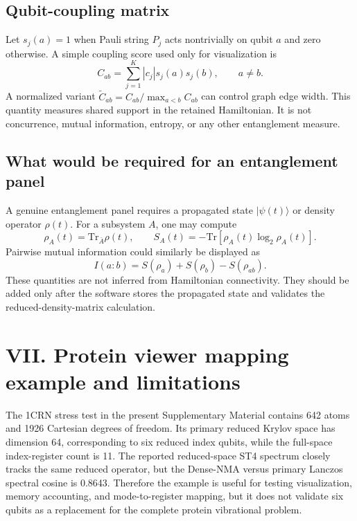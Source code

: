 \documentclass[10pt]{article}
\begin{document}
\subsection*{Qubit-coupling matrix}
Let $s_j(a)=1$ when Pauli string $P_j$ acts nontrivially on qubit $a$ and zero otherwise. A simple coupling score used only for visualization is
\begin{equation}
 C_{ab}=\sum_{j=1}^{K}|c_j|s_j(a)s_j(b),\qquad a\neq b.
\end{equation}
A normalized variant $\widetilde C_{ab}=C_{ab}/\max_{a<b}C_{ab}$ can control graph edge width. This quantity measures shared support in the retained Hamiltonian. It is not concurrence, mutual information, entropy, or any other entanglement measure.

\subsection*{What would be required for an entanglement panel}
A genuine entanglement panel requires a propagated state $|\psi(t)\rangle$ or density operator $\rho(t)$. For a subsystem $A$, one may compute
\begin{equation}
 \rho_A(t)=\mathrm{Tr}_{\bar A}\rho(t),\qquad
 S_A(t)=-\mathrm{Tr}\left[\rho_A(t)\log_2\rho_A(t)\right].
\end{equation}
Pairwise mutual information could similarly be displayed as
\begin{equation}
 I(a:b)=S(\rho_a)+S(\rho_b)-S(\rho_{ab}).
\end{equation}
These quantities are not inferred from Hamiltonian connectivity. They should be added only after the software stores the propagated state and validates the reduced-density-matrix calculation.

\section*{VII. Protein viewer mapping example and limitations}
The 1CRN stress test in the present Supplementary Material contains 642 atoms and 1926 Cartesian degrees of freedom. Its primary reduced Krylov space has dimension 64, corresponding to six reduced index qubits, while the full-space index-register count is 11. The reported reduced-space ST4 spectrum closely tracks the same reduced operator, but the Dense-NMA versus primary Lanczos spectral cosine is 0.8643. Therefore the example is useful for testing visualization, memory accounting, and mode-to-register mapping, but it does not validate six qubits as a replacement for the complete protein vibrational problem.
\end{document}
